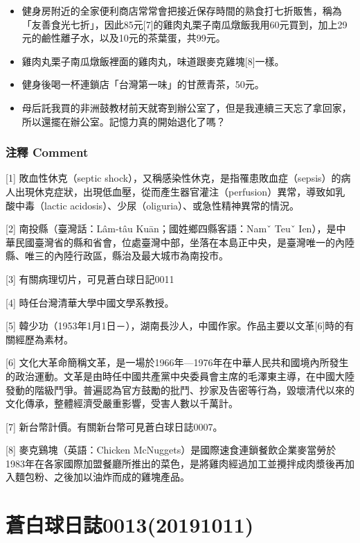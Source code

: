 \documentclass[a5paper, 12pt
]{book}
\providecommand{\tightlist}{%
  \setlength{\itemsep}{0pt}\setlength{\parskip}{0pt}}
\begin{document}
\begin{enumerate}
  \begin{itemize}
  \tightlist
  \item
    健身房附近的全家便利商店常常會把接近保存時間的熟食打七折販售，稱為「友善食光七折」，因此85元{[}7{]}的雞肉丸栗子南瓜燉飯我用60元買到，加上29元的鹼性離子水，以及10元的茶葉蛋，共99元。
  \item
    雞肉丸栗子南瓜燉飯裡面的雞肉丸，味道跟麥克雞塊{[}8{]}一樣。
  \item
    健身後喝一杯連鎖店「台灣第一味」的甘蔗青茶，50元。
  \item
    母后託我買的非洲鼓教材前天就寄到辦公室了，但是我連續三天忘了拿回家，所以還擺在辦公室。記憶力真的開始退化了嗎？
  \end{itemize}
\end{enumerate}

\hypertarget{ux6ce8ux91cb-comment-5}{%
\subsubsection{注釋 Comment}\label{ux6ce8ux91cb-comment-5}}

{[}1{]} 敗血性休克（septic
shock），又稱感染性休克，是指罹患敗血症（sepsis）的病人出現休克症狀，出現低血壓，從而產生器官灌注（perfusion）異常，導致如乳酸中毒（lactic
acidosis）、少尿（oliguria）、或急性精神異常的情況。

{[}2{]} 南投縣（臺灣話：Lâm-tâu Kuān；國姓鄉四縣客語：Namˇ Teuˇ
Ien），是中華民國臺灣省的縣和省會，位處臺灣中部，坐落在本島正中央，是臺灣唯一的內陸縣、唯三的內陸行政區，縣治及最大城市為南投市。

{[}3{]} 有關病理切片，可見蒼白球日記0011

{[}4{]} 時任台灣清華大學中國文學系教授。

{[}5{]}
韓少功（1953年1月1日－），湖南長沙人，中國作家。作品主要以文革{[}6{]}時的有關經歷為素材。

{[}6{]}
文化大革命簡稱文革，是一場於1966年---1976年在中華人民共和國境內所發生的政治運動。文革是由時任中國共產黨中央委員會主席的毛澤東主導，在中國大陸發動的階級鬥爭。普遍認為官方鼓勵的批鬥、抄家及告密等行為，毀壞清代以來的文化傳承，整體經濟受嚴重影響，受害人數以千萬計。

{[}7{]} 新台幣計價。有關新台幣可見蒼白球日誌0007。

{[}8{]} 麥克鷄塊（英語：Chicken
McNuggets）是國際速食連鎖餐飲企業麥當勞於1983年在各家國際加盟餐廳所推出的菜色，是將雞肉經過加工並攪拌成肉漿後再加入麵包粉、之後加以油炸而成的雞塊產品。

\hypertarget{ux84bcux767dux7403ux65e5ux8a8c001320191011}{%
\section{蒼白球日誌0013(20191011)}\label{ux84bcux767dux7403ux65e5ux8a8c001320191011}}
\end{document}
